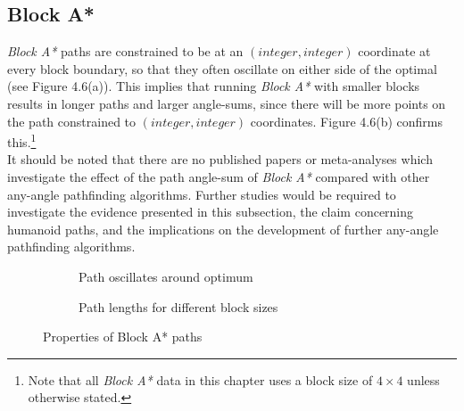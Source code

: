\documentclass[12pt,notitlepage]{report}
\begin{document}
\subsection{Block A*}
{\em Block A*} paths are constrained to be at an $(integer,integer)$ coordinate at every block boundary, so that they often oscillate on either side of the optimal (see Figure 4.6(a)). This implies that running {\em Block A*} with smaller blocks results in longer paths and larger angle-sums, since there will be more points on the path constrained to $(integer,integer)$ coordinates. Figure 4.6(b) confirms this.\footnote{Note that all {\em Block A*} data in this chapter uses a block size of $4 \times 4$ unless otherwise stated.}\\

\noindent
It should be noted that there are no published papers or meta-analyses which investigate the effect of the path angle-sum of {\em Block A*} compared with other any-angle pathfinding algorithms. Further studies would be required to investigate the evidence presented in this subsection, the claim concerning humanoid paths, and the implications on the development of further any-angle pathfinding algorithms.

\begin{figure}
\centering
  \begin{subfigure}[b]{0.49\textwidth}
  \centering
  \caption{Path oscillates around optimum}
  \end{subfigure}
  \begin{subfigure}[b]{0.49\textwidth}
  \centering
  
  \caption{Path lengths for different block sizes}
  \end{subfigure}
\caption{Properties of Block A* paths}
\end{figure}
\end{document}
